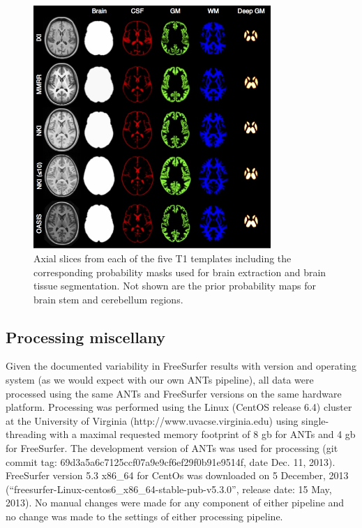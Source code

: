 \begin{figure}
  \centering
  \includegraphics[width=90mm]{Figures/templateProbabilityMasks.jpg}
  \caption{Axial slices from each of the five T1 templates including the corresponding
  probability masks used for brain extraction and brain tissue segmentation.  Not shown
  are the prior probability maps for brain stem and cerebellum regions.
  }
  \label{fig:templateMasks}
\end{figure}


\subsection{Processing miscellany}

Given the documented variability in FreeSurfer results with version and
operating system \citep{gronenschild2012} (as we would expect with our own ANTs pipeline),
all data were processed using the same ANTs and FreeSurfer versions on the same 
hardware platform.  Processing was performed using the Linux (CentOS release 6.4) 
cluster at the University 
of Virginia (http://www.uvacse.virginia.edu)
using single-threading with a maximal requested memory footprint of 8 gb for ANTs 
and 4 gb for FreeSurfer.  The development version of ANTs was used for processing 
(git commit tag: 69d3a5a6c7125ccf07a9e9cf6ef29f0b91e9514f, date Dec. 11, 2013).  
FreeSurfer version 5.3 x86\_64 for CentOs was downloaded 
on 5 December, 2013 (``freesurfer-Linux-centos6\_x86\_64-stable-pub-v5.3.0'', release
date: 15 May, 2013).   {\color{blue}{The brain extraction and segmentation results from both 
pipelines were visually inspected to screen for major problems.}}
No manual changes were made for any component of either pipeline and no change was made to the settings of either processing pipeline.




